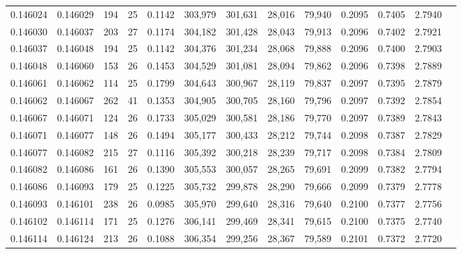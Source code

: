 \begin{tabular}{rrrrrrrrrrrrr}
0.146024 & 0.146029 & 194 &  25 &                                     0.1142 & 303,979 & 301,631 &  28,016 &  79,940 & 0.2095 & 0.7405 & 2.7940 \\
0.146030 & 0.146037 & 203 &  27 &                                     0.1174 & 304,182 & 301,428 &  28,043 &  79,913 & 0.2096 & 0.7402 & 2.7921 \\
0.146037 & 0.146048 & 194 &  25 &                                     0.1142 & 304,376 & 301,234 &  28,068 &  79,888 & 0.2096 & 0.7400 & 2.7903 \\
0.146048 & 0.146060 & 153 &  26 &                                     0.1453 & 304,529 & 301,081 &  28,094 &  79,862 & 0.2096 & 0.7398 & 2.7889 \\
0.146061 & 0.146062 & 114 &  25 &                                     0.1799 & 304,643 & 300,967 &  28,119 &  79,837 & 0.2097 & 0.7395 & 2.7879 \\
0.146062 & 0.146067 & 262 &  41 &                                     0.1353 & 304,905 & 300,705 &  28,160 &  79,796 & 0.2097 & 0.7392 & 2.7854 \\
0.146067 & 0.146071 & 124 &  26 &                                     0.1733 & 305,029 & 300,581 &  28,186 &  79,770 & 0.2097 & 0.7389 & 2.7843 \\
0.146071 & 0.146077 & 148 &  26 &                                     0.1494 & 305,177 & 300,433 &  28,212 &  79,744 & 0.2098 & 0.7387 & 2.7829 \\
0.146077 & 0.146082 & 215 &  27 &                                     0.1116 & 305,392 & 300,218 &  28,239 &  79,717 & 0.2098 & 0.7384 & 2.7809 \\
0.146082 & 0.146086 & 161 &  26 &                                     0.1390 & 305,553 & 300,057 &  28,265 &  79,691 & 0.2099 & 0.7382 & 2.7794 \\
0.146086 & 0.146093 & 179 &  25 &                                     0.1225 & 305,732 & 299,878 &  28,290 &  79,666 & 0.2099 & 0.7379 & 2.7778 \\
0.146093 & 0.146101 & 238 &  26 &                                     0.0985 & 305,970 & 299,640 &  28,316 &  79,640 & 0.2100 & 0.7377 & 2.7756 \\
0.146102 & 0.146114 & 171 &  25 &                                     0.1276 & 306,141 & 299,469 &  28,341 &  79,615 & 0.2100 & 0.7375 & 2.7740 \\
0.146114 & 0.146124 & 213 &  26 &                                     0.1088 & 306,354 & 299,256 &  28,367 &  79,589 & 0.2101 & 0.7372 & 2.7720 \\

\end{tabular}

